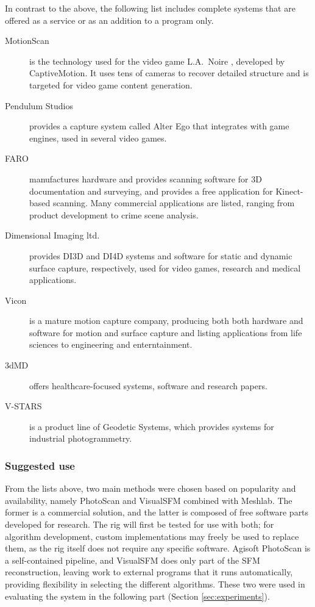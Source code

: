 In contrast to the above, the following list includes complete systems that are offered as a service or as an addition to a program only.

\begin{description}
	\item[MotionScan] is the technology used for the video game L.A.\ Noire \cite{rockstar2011noire}, developed by CaptiveMotion. It uses tens of cameras to recover detailed structure and is targeted for video game content generation.

	\item[Pendulum Studios] \cite{alterego} provides a capture system called Alter Ego that integrates with game engines, used in several video games.

	\item [FARO] \cite{faro} manufactures hardware and provides scanning software for 3D documentation and surveying, and provides a free application for Kinect-based scanning. Many commercial applications are listed, ranging from product development to crime scene analysis.

	\item[Dimensional Imaging ltd.] \cite{di4d} provides DI3D and DI4D systems and software for static and dynamic surface capture, respectively, used for video games, research and medical applications.

	\item[Vicon] \cite{vicon} is a mature motion capture company, producing both both hardware and software for motion and surface capture and listing applications from life sciences to engineering and enterntainment.

	\item[3dMD] \cite{3dmd} offers healthcare-focused systems, software and research papers.

	\item[V-STARS] \cite{vstars} is a product line of Geodetic Systems, which provides systems for industrial photogrammetry.
\end{description}

\subsubsection{Suggested use} %

From the lists above, two main methods were chosen based on popularity and availability, namely PhotoScan and VisualSFM combined with Meshlab.
The former is a commercial solution, and the latter is composed of free software parts developed for research.
The rig will first be tested for use with both; for algorithm development, custom implementations may freely be used to replace them, as the rig itself does not require any specific software.
Agisoft PhotoScan is a self-contained pipeline, and VisualSFM does only part of the SFM reconstruction, leaving work to external programs that it runs automatically, providing flexibility in selecting the different algorithms.
These two were used in evaluating the system in the following part (Section \ref{sec:experiments}).

